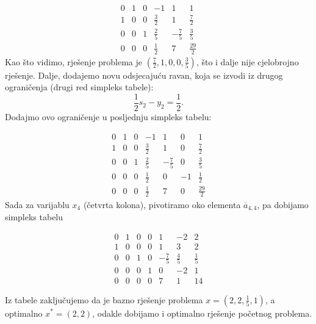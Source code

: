 \documentclass[a4paper, utf8, 11pt, colorlinks]{book}
\begin{document}
$$
\begin{array}{ccccc|c}
    0    &  1  &   0 &   -1  &            1 & 1                  \\
    1    &  0  &  0 &    \frac{3}{2}  &  1 & \frac{7}{2}\\ 
    0    &  0  &  1  &   \frac{2}{5}    &  -\frac{7}{5} & \frac{3}{5}  \\
     \hline 
    0    &  0  &  0   &    \frac{1}{2}  &  7  &    \frac{29}{2}
\end{array}
$$
Kao što vidimo, rješenje problema je $(\frac{7}{2}, 1, 0, 0, \frac{3}{5})$, što i dalje nije cjelobrojno rješenje. Dalje, dodajemo novu odsjecajuću ravan, koja se izvodi iz drugog ograničenja (drugi red simpleks tabele): 
$$ \frac{1}{2} s_2 - y_2 = \frac{1}{2}.$$
Dodajmo ovo ograničenje u posljednju simpleks tabelu:

$$
\begin{array}{cccccc|c}
    0    &  1  &   0 &   -1  &            1 & 0 & 1                  \\
    1    &  0  &  0 &    \frac{3}{2}    &  1 & 0 &  \frac{7}{2}\\ 
    0    &  0  &  1  &   \frac{2}{5}    &  -\frac{7}{5} &  0 & \frac{3}{5}  \\
    0    & 0   &  0  &   \frac{1}{2}    & 0     & -1 & \frac{1}{2} \\
     \hline 
    0    &  0  &  0   &    \frac{1}{2}  &  7  &   0 &  \frac{29}{2}
\end{array}
$$
Sada za varijablu $x_4$ (četvrta kolona), pivotiramo oko elementa $\overline{a}_{4,4}$, pa dobijamo simpleks tabelu 

$$
\begin{array}{cccccc|c}
0 &  1   &  0  &  0  &    1             &    -2           &   2         \\
1 &  0   &  0  &  0  &    1             &     3           &   2         \\
0 &  0   &  1  &  0  &   -\frac{7}{5}   &     \frac{4}{5} &   \frac{1}{5}\\
0 &  0   &  0  &  1  &   0              &    -2           &   1   \\ \hline
0 &  0   &  0  &  0  &   7              &     1           &   14
\end{array}
$$


Iz tabele zaključujemo da je bazno rješenje problema 
$x=(2,2, \frac{1}{5}, 1)$, a optimalno $x^* = (2, 2)$, odakle dobijamo i optimalno rješenje početnog problema. 
\end{document}
